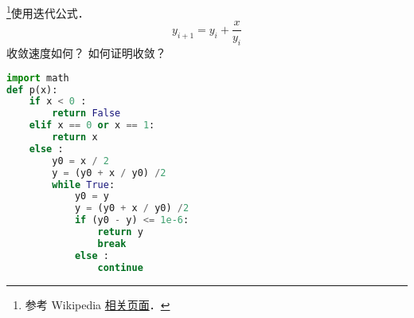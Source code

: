 
\begin{issues}
\issueDraft
\end{issues}

\footnote{参考 Wikipedia \href{https://en.wikipedia.org/wiki/Methods_of_computing_square_roots}{相关页面}．}使用迭代公式．
\begin{equation}
y_{i+1} = y_i + \frac{x}{y_i}
\end{equation}
收敛速度如何？ 如何证明收敛？

\begin{lstlisting}[language=python]
import math
def p(x):
    if x < 0 :
        return False
    elif x == 0 or x == 1:
        return x
    else :
        y0 = x / 2
        y = (y0 + x / y0) /2
        while True:
            y0 = y
            y = (y0 + x / y0) /2
            if (y0 - y) <= 1e-6:
                return y
                break
            else :
                continue
\end{lstlisting}
